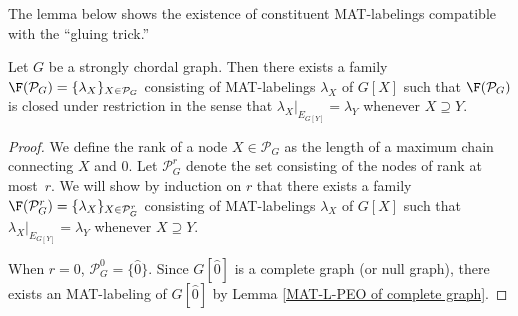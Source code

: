 The lemma below shows the existence of constituent MAT-labelings compatible with the ``gluing trick.''
\begin{lemma}\label{node MAT-labeling}
Let $ G $ be a strongly chordal graph. 
Then there exists a family $\F(\mathcal{P}_{G})= \{\lambda_{X}\}_{X \in \mathcal{P}_{G}} $ consisting of MAT-labelings $ \lambda_{X} $ of $ G[X] $ such that $\F(\mathcal{P}_{G})$ is closed under restriction in the sense that $ \lambda_{X}|_{E_{G[Y]}} = \lambda_{Y} $ whenever $ X \supseteq Y $. 
\end{lemma}
\begin{proof}
We define the rank of a node $ X \in \mathcal{P}_{G} $ as the length of a maximum chain connecting $ X $ and $ \hat{0} $.
Let $ \mathcal{P}_{G}^{r} $ denote the set consisting of the nodes of rank at most~$ r $. 
We will show by induction on $ r $ that there exists a family $\F( \mathcal{P}_{G}^{r})= \{\lambda_{X}\}_{X \in \mathcal{P}_{G}^{r}} $ consisting of MAT-labelings $ \lambda_{X} $ of $ G[X] $ such that $ \lambda_{X}|_{E_{G[Y]}} = \lambda_{Y} $ whenever $ X \supseteq Y $. 

When $ r = 0 $, $ \mathcal{P}_{G}^{0} = \{\hat{0}\} $. 
Since $ G[\hat{0}] $ is a complete graph (or null graph), there exists an MAT-labeling of $ G[\hat{0}] $ by Lemma \ref{MAT-L-PEO of complete graph}. 


\end{proof}
